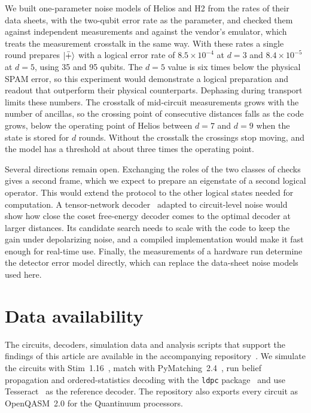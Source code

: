 We built one-parameter noise models of Helios and H2 from the rates of their data sheets, with the two-qubit error rate as the parameter, and checked them against independent measurements and against the vendor's emulator, which treats the measurement crosstalk in the same way. With these rates a single round prepares $\left|\bar{+}\right\rangle$ with a logical error rate of $8.5\times10^{-4}$ at $d=3$ and $8.4\times10^{-5}$ at $d=5$, using 35 and 95 qubits. The $d=5$ value is six times below the physical SPAM error, so this experiment would demonstrate a logical preparation and readout that outperform their physical counterparts. Dephasing during transport limits these numbers. The crosstalk of mid-circuit measurements grows with the number of ancillas, so the crossing point of consecutive distances falls as the code grows, below the operating point of Helios between $d=7$ and $d=9$ when the state is stored for $d$ rounds. Without the crosstalk the crossings stop moving, and the model has a threshold at about three times the operating point.

Several directions remain open. Exchanging the roles of the two classes of checks gives a second frame, which we expect to prepare an eigenstate of a second logical operator. This would extend the protocol to the other logical states needed for computation. A tensor-network decoder~\cite{chubb2021} adapted to circuit-level noise would show how close the coset free-energy decoder comes to the optimal decoder at larger distances. Its candidate search needs to scale with the code to keep the gain under depolarizing noise, and a compiled implementation would make it fast enough for real-time use. Finally, the measurements of a hardware run determine the detector error model directly, which can replace the data-sheet noise models used here.

\section*{Data availability}

The circuits, decoders, simulation data and analysis scripts that support the findings of this article are available in the accompanying repository~\cite{repo}. We simulate the circuits with Stim~1.16~\cite{gidney2021stim}, match with PyMatching~2.4~\cite{higgott2022pymatching,higgott2025sparse}, run belief propagation and ordered-statistics decoding with the \texttt{ldpc} package~\cite{roffe2020} and use Tesseract~\cite{beni2025} as the reference decoder. The repository also exports every circuit as OpenQASM~2.0 for the Quantinuum processors.
